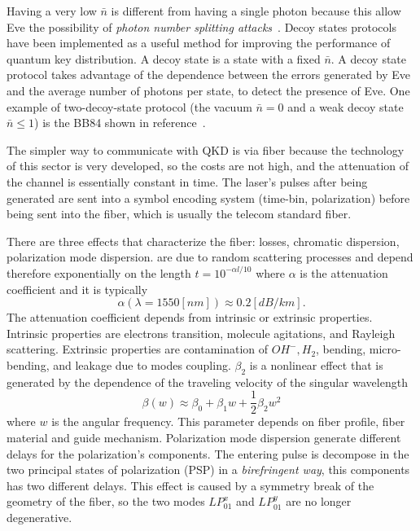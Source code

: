Having a very low $\bar{n}$ is different from having a single photon because this allow Eve the possibility of \textit{photon number splitting attacks}~\cite{a24}.
Decoy states protocols have been implemented as a useful method for improving the performance of quantum key distribution. A decoy state is a state with a fixed $\bar{n}$. A decoy state protocol takes advantage of the dependence between the errors generated by Eve and the average number of photons per state, to detect the presence of Eve.
One example of two-decoy-state protocol (the vacuum $\bar{n} = 0$ and a weak decoy state $\bar{n} \le 1$) is the BB84 shown in reference~\cite{b24}.


The simpler way to communicate with QKD is via fiber because the technology of this sector is very developed, so the costs are not high, and the attenuation of the channel is essentially constant in time. The laser's pulses after being generated are sent into a symbol encoding system (time-bin, polarization) before being sent into the fiber, which is usually the telecom standard fiber.

There are three effects that characterize the fiber: losses, chromatic dispersion, polarization mode dispersion.  are due to random scattering processes and depend therefore exponentially on the length $t = 10^{-\alpha l / 10}$ where $\alpha$ is the attenuation coefficient and it is typically
\begin{equation}
  \alpha(\lambda = 1550[nm]) \approx 0.2 [dB / km].
\end{equation}
The attenuation coefficient depends from intrinsic or extrinsic properties. Intrinsic properties are electrons transition, molecule agitations, and Rayleigh scattering. Extrinsic properties are contamination of $OH^-, H_2$, bending, micro-bending, and leakage due to modes coupling.  $\beta_2$ is a nonlinear effect that is generated by the dependence of the traveling velocity of the singular wavelength
\begin{equation}
  \beta(w) \approx \beta_0 + \beta_1 w + \frac{1}{2} \beta_2 w^2
\end{equation}
where $w$ is the angular frequency. This parameter depends on fiber profile, fiber material and guide mechanism. Polarization mode dispersion  generate different delays for the polarization's components. The entering pulse is decompose in the two principal states of polarization (PSP) in a \textit{birefringent way}, this components has two different delays. This effect is caused by a symmetry break of the geometry of the fiber, so the two modes $LP_{01}^x$ and $LP_{01}^y$ are no longer degenerative.

